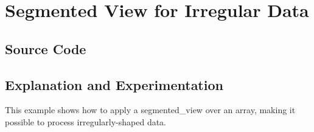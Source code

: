 \documentclass{report}
\begin{document}
\pagebreak
\section{Segmented View for Irregular Data}

\subsection{Source Code}



\subsection{Explanation and Experimentation}

This example shows how to apply a segmented\_view over an array,
making it possible to process irregularly-shaped data.
\end{document}
